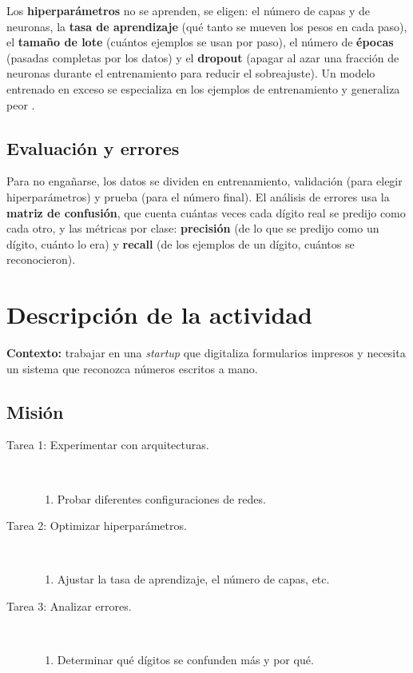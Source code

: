 \documentclass[11pt,letterpaper]{article}
\begin{document}
Los \textbf{hiperparámetros} no se aprenden, se eligen: el número de capas y de neuronas, la \textbf{tasa de aprendizaje} (qué tanto se mueven los pesos en cada paso), el \textbf{tamaño de lote} (cuántos ejemplos se usan por paso), el número de \textbf{épocas} (pasadas completas por los datos) y el \textbf{dropout} (apagar al azar una fracción de neuronas durante el entrenamiento para reducir el sobreajuste). Un modelo entrenado en exceso se especializa en los ejemplos de entrenamiento y generaliza peor \parencite{iae_u4_t44}.

\subsection{Evaluación y errores}

Para no engañarse, los datos se dividen en entrenamiento, validación (para elegir hiperparámetros) y prueba (para el número final). El análisis de errores usa la \textbf{matriz de confusión}, que cuenta cuántas veces cada dígito real se predijo como cada otro, y las métricas por clase: \textbf{precisión} (de lo que se predijo como un dígito, cuánto lo era) y \textbf{recall} (de los ejemplos de un dígito, cuántos se reconocieron).

\section{Descripción de la actividad}

\textbf{Contexto:} trabajar en una \textit{startup} que digitaliza formularios impresos y necesita un sistema que reconozca números escritos a mano.

\subsection*{Misión}

\begin{description}
    \item[Tarea 1: Experimentar con arquitecturas.]\mbox{}\\[-1.3\baselineskip]
    \begin{enumerate}
        \item Probar diferentes configuraciones de redes.
    \end{enumerate}
    \item[Tarea 2: Optimizar hiperparámetros.]\mbox{}\\[-1.3\baselineskip]
    \begin{enumerate}
        \item Ajustar la tasa de aprendizaje, el número de capas, etc.
    \end{enumerate}
    \item[Tarea 3: Analizar errores.]\mbox{}\\[-1.3\baselineskip]
    \begin{enumerate}
        \item Determinar qué dígitos se confunden más y por qué.
    \end{enumerate}
\end{description}
\end{document}

